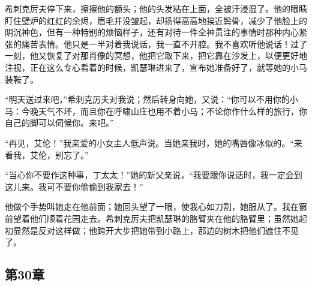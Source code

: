 \par 希刺克厉夫停下来，擦擦他的额头；他的头发粘在上面，全被汗浸湿了。他的眼睛盯住壁炉的红红的余烬，眉毛并没皱起，却扬得高高地挨近鬓骨，减少了他脸上的阴沉神色，但有一种特别的烦恼样子，还有对待一件全神贯注的事情时那种内心紧张的痛苦表情。他只是一半对着我说话，我一直不开腔。我不喜欢听他说话！过了一刻，他又恢复了对那肖像的冥想，他把它取下来，把它靠在沙发上，以便更好地注视，正在这么专心看着的时候，凯瑟琳进来了，宣布她准备好了，就等她的小马装鞍了。
\par “明天送过来吧，”希刺克厉夫对我说；然后转身向她，又说：“你可以不用你的小马：今晚天气不坏，而且你在呼啸山庄也用不着小马；不论你作什么样的旅行，你自己的脚可以伺候你。来吧。”
\par “再见，艾伦！”我亲爱的小女主人低声说。当她亲我时，她的嘴唇像冰似的。“来看我，艾伦，别忘了。”
\par “当心你不要作这种事，丁太太！”她的新父亲说，“我要跟你说话时，我一定会到这儿来。我可不要你偷偷到我家去！”
\par 他做个手势叫她走在他前面；她回头望了一眼，使我心如刀割，她服从了。我在窗前望着他们顺着花园走去。希刺克厉夫把凯瑟琳的胳臂夹在他的胳臂里；虽然她起初显然是反对这样做；他跨开大步把她带到小路上，那边的树木把他们遮住不见了。


\subsection{第30章}

